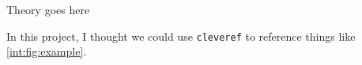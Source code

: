 Theory goes here

In this project, I thought we could use \verb|cleveref| to reference things like \cref{int:fig:example}.